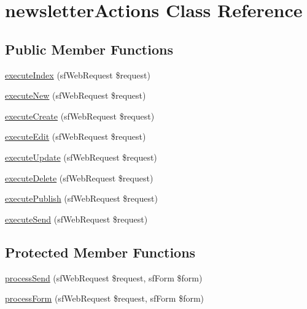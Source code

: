 \hypertarget{classnewsletter_actions}{\section{newsletter\-Actions Class Reference}
\label{classnewsletter_actions}
}
\subsection*{Public Member Functions}
\begin{DoxyCompactItemize}
\item 
\hyperlink{classnewsletter_actions_a948cc911eb1d9f77990be54af3b2080f}{execute\-Index} (sf\-Web\-Request \$request)
\item 
\hyperlink{classnewsletter_actions_a0ffbea56560c6c633dae68ec22aff21c}{execute\-New} (sf\-Web\-Request \$request)
\item 
\hyperlink{classnewsletter_actions_a75837617743fb64dca82d8133b2c662a}{execute\-Create} (sf\-Web\-Request \$request)
\item 
\hyperlink{classnewsletter_actions_af4d8fedd4b28f3398826a1bb8fa54394}{execute\-Edit} (sf\-Web\-Request \$request)
\item 
\hyperlink{classnewsletter_actions_af7b4f51862add3c2ebb54efc136a0840}{execute\-Update} (sf\-Web\-Request \$request)
\item 
\hyperlink{classnewsletter_actions_a52b5b11b11a0070dd2662257520c045a}{execute\-Delete} (sf\-Web\-Request \$request)
\item 
\hyperlink{classnewsletter_actions_aa4e873d9ebb715ddc53cca341527a443}{execute\-Publish} (sf\-Web\-Request \$request)
\item 
\hyperlink{classnewsletter_actions_a2d3532159fd99b70514ab09d62786cb8}{execute\-Send} (sf\-Web\-Request \$request)
\end{DoxyCompactItemize}
\subsection*{Protected Member Functions}
\begin{DoxyCompactItemize}
\item 
\hyperlink{classnewsletter_actions_afa1ae2ef5aa1238c577a716ab556dfac}{process\-Send} (sf\-Web\-Request \$request, sf\-Form \$form)
\item 
\hyperlink{classnewsletter_actions_a7cf661d837626e0320753cbffa019a01}{process\-Form} (sf\-Web\-Request \$request, sf\-Form \$form)
\end{DoxyCompactItemize}


